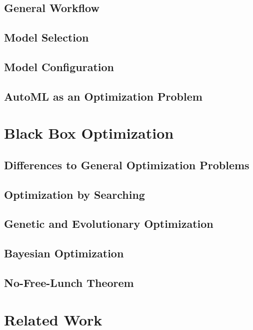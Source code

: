 \Blindtext

\subsection{General Workflow}
\label{sec:theory:automl:workflow}

\Blindtext

\subsection{Model Selection}
\label{sec:theory:automl:selection}

\Blindtext

\subsection{Model Configuration}
\label{sec:theory:automl:configuration}

\Blindtext

\subsection{AutoML as an Optimization Problem}
\label{sec:theory:automl:optimization}

\Blindtext


\section{Black Box Optimization}
\label{sec:theory:optimization}

\Blindtext

\subsection{Differences to General Optimization Problems}
\label{sec:theory:optimization:differences}

\Blindtext

\subsection{Optimization by Searching}
\label{sec:theory:optimization:search}

\Blindtext

\subsection{Genetic and Evolutionary Optimization}
\label{sec:theory:optimization:genetic}

\Blindtext

\subsection{Bayesian Optimization}
\label{sec:theory:optimization:bayesian}

\Blindtext

\subsection{No-Free-Lunch Theorem}
\label{sec:theory:optimization:lunch}

\Blindtext

\section{Related Work}
\label{sec:theory:related}

\Blindtext
